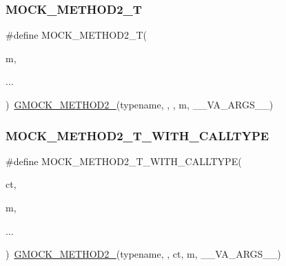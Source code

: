 \mbox{\label{_obj__test_2lib_2googletest-master_2googlemock_2include_2gmock_2gmock-generated-function-mockers_8h_adb6e8d8bd6ab614c62d8ecc2ec163e3c}} 
\subsubsection{\texorpdfstring{MOCK\_METHOD2\_T}{MOCK\_METHOD2\_T}}
{\footnotesize\ttfamily \#define M\+O\+C\+K\+\_\+\+M\+E\+T\+H\+O\+D2\+\_\+T(\begin{DoxyParamCaption}\item[{}]{m,  }\item[{}]{... }\end{DoxyParamCaption})~\mbox{\hyperlink{_obj__test_2lib_2googletest-release-1_88_81_2googlemock_2include_2gmock_2gmock-generated-function-mockers_8h_a885295ca6bebb15efb3fc786218c5d47}{G\+M\+O\+C\+K\+\_\+\+M\+E\+T\+H\+O\+D2\+\_\+}}(typename, , , m, \+\_\+\+\_\+\+V\+A\+\_\+\+A\+R\+G\+S\+\_\+\+\_\+)}

\mbox{\label{_obj__test_2lib_2googletest-master_2googlemock_2include_2gmock_2gmock-generated-function-mockers_8h_a18e4e8da0bdf27bde5ffca30587ff074}} 
\subsubsection{\texorpdfstring{MOCK\_METHOD2\_T\_WITH\_CALLTYPE}{MOCK\_METHOD2\_T\_WITH\_CALLTYPE}}
{\footnotesize\ttfamily \#define M\+O\+C\+K\+\_\+\+M\+E\+T\+H\+O\+D2\+\_\+\+T\+\_\+\+W\+I\+T\+H\+\_\+\+C\+A\+L\+L\+T\+Y\+PE(\begin{DoxyParamCaption}\item[{}]{ct,  }\item[{}]{m,  }\item[{}]{... }\end{DoxyParamCaption})~\mbox{\hyperlink{_obj__test_2lib_2googletest-release-1_88_81_2googlemock_2include_2gmock_2gmock-generated-function-mockers_8h_a885295ca6bebb15efb3fc786218c5d47}{G\+M\+O\+C\+K\+\_\+\+M\+E\+T\+H\+O\+D2\+\_\+}}(typename, , ct, m, \+\_\+\+\_\+\+V\+A\+\_\+\+A\+R\+G\+S\+\_\+\+\_\+)}

